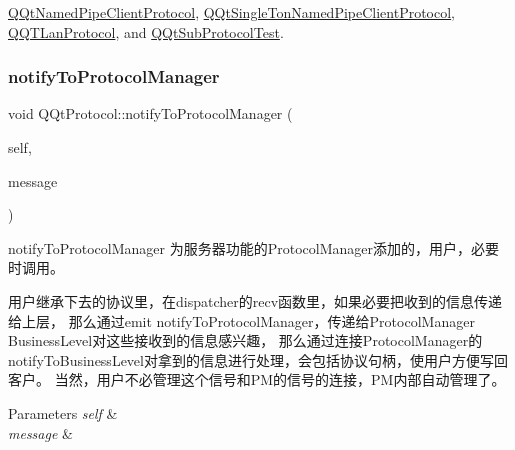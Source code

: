 \mbox{\hyperlink{class_q_qt_named_pipe_client_protocol_a2575aa4579cdf49b29c3a830e83d90a1}{Q\+Qt\+Named\+Pipe\+Client\+Protocol}}, \mbox{\hyperlink{class_q_qt_single_ton_named_pipe_client_protocol_a77883d9ccc219b37ae080cc91be70c09}{Q\+Qt\+Single\+Ton\+Named\+Pipe\+Client\+Protocol}}, \mbox{\hyperlink{class_q_q_t_lan_protocol_aa554a0956cf9790958b6959211d8cea3}{Q\+Q\+T\+Lan\+Protocol}}, and \mbox{\hyperlink{class_q_qt_sub_protocol_test_a42b8ca064326139d26bc20e76f356a6a}{Q\+Qt\+Sub\+Protocol\+Test}}.

\mbox{\label{class_q_qt_protocol_a95af0a9e22be37f68d953449e2c8e21d}} 
\subsubsection{\texorpdfstring{notify\+To\+Protocol\+Manager}{notifyToProtocolManager}}
{\footnotesize\ttfamily void Q\+Qt\+Protocol\+::notify\+To\+Protocol\+Manager (\begin{DoxyParamCaption}\item[{const \mbox{\hyperlink{class_q_qt_protocol}{Q\+Qt\+Protocol}} $\ast$}]{self,  }\item[{const \mbox{\hyperlink{class_q_qt_message}{Q\+Qt\+Message}} $\ast$}]{message }\end{DoxyParamCaption})\hspace{0.3cm}{\ttfamily [signal]}}



notify\+To\+Protocol\+Manager 为服务器功能的\+Protocol\+Manager添加的，用户，必要时调用。 

用户继承下去的协议里，在dispatcher的recv函数里，如果必要把收到的信息传递给上层， 那么通过emit notify\+To\+Protocol\+Manager，传递给\+Protocol\+Manager Business\+Level对这些接收到的信息感兴趣， 那么通过连接\+Protocol\+Manager的notify\+To\+Business\+Level对拿到的信息进行处理，会包括协议句柄，使用户方便写回客户。 当然，用户不必管理这个信号和\+P\+M的信号的连接，\+P\+M内部自动管理了。 
\begin{DoxyParams}{Parameters}
{\em self} & \\
\hline
{\em message} & \\
\hline
\end{DoxyParams}
\mbox{\label{class_q_qt_protocol_a00fd0c1ac23379ed3b9b25da9a34f39b}} 
